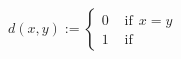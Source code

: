 \documentclass[preview]{standalone}
\begin{document}
\begin{align*}
d(x,y) := \begin{cases}0  &  \text{ if} \ \ x=y \\1 &  \text{ if}\end{cases}
\end{align*}
\end{document}
